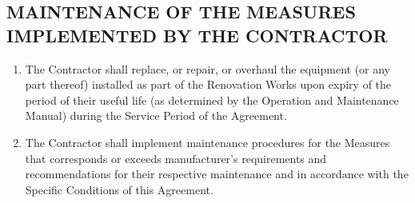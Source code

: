 \begin{multicols}{2}
\subsection{MAINTENANCE OF THE MEASURES IMPLEMENTED BY THE CONTRACTOR}
\begin{enumerate}
	\item	The Contractor shall replace, or repair, or overhaul the equipment (or any part thereof) installed as part of the Renovation Works upon expiry of the period of their useful life (as determined by the Operation and Maintenance Manual) during the Service Period of the Agreement.
	\item	The Contractor shall implement maintenance procedures for the Measures that corresponds or exceeds manufacturer’s requirements and recommendations for their respective maintenance and in accordance with the Specific Conditions of this Agreement.
\end{enumerate}


\end{multicols}
